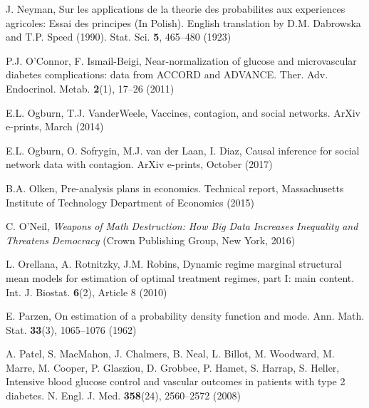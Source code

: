 \begin{list}{}{\setlength{\leftmargin}{2.1em}\setlength{\labelwidth}{0pt}
  \setlength{\labelsep}{0pt}\setlength{\itemindent}{-2.1em}
  \setlength{\parsep}{0pt}\setlength{\itemsep}{2pt}\setlength{\topsep}{0pt}}
\item\label{refentry:REF252}J. Neyman, Sur les applications de la theorie des probabilites aux experiences agricoles: Essai des principes (In Polish). English translation by D.M. Dabrowska and T.P. Speed (1990). Stat. Sci. \textbf{5}, 465--480 (1923)\label{refend:REF252}
\item\label{refentry:REF253}P.J. O'Connor, F. Ismail-Beigi, Near-normalization of glucose and microvascular diabetes complications: data from ACCORD and ADVANCE. Ther. Adv. Endocrinol. Metab. \textbf{2}(1), 17--26 (2011)\label{refend:REF253}
\item\label{refentry:REF254}E.L. Ogburn, T.J. VanderWeele, Vaccines, contagion, and social networks. ArXiv e-prints, March (2014)\label{refend:REF254}
\item\label{refentry:REF255}E.L. Ogburn, O. Sofrygin, M.J. van der Laan, I. Diaz, Causal inference for social network data with contagion. ArXiv e-prints, October (2017)\label{refend:REF255}
\item\label{refentry:REF256}B.A. Olken, Pre-analysis plans in economics. Technical report, Massachusetts Institute of Technology Department of Economics (2015)\label{refend:REF256}
\item\label{refentry:REF257}C. O'Neil, \textit{Weapons} \textit{of} \textit{Math} \textit{Destruction:} \textit{How} \textit{Big} \textit{Data} \textit{Increases} \textit{Inequality} \textit{and} \textit{Threatens} \textit{Democracy} (Crown Publishing Group, New York, 2016)\label{refend:REF257}
\item\label{refentry:REF258}L. Orellana, A. Rotnitzky, J.M. Robins, Dynamic regime marginal structural mean models for estimation of optimal treatment regimes, part I: main content. Int. J. Biostat. \textbf{6}(2), Article 8 (2010)\label{refend:REF258}
\item\label{refentry:REF259}E. Parzen, On estimation of a probability density function and mode. Ann. Math. Stat. \textbf{33}(3), 1065--1076 (1962)\label{refend:REF259}
\item\label{refentry:REF260}A. Patel, S. MacMahon, J. Chalmers, B. Neal, L. Billot, M. Woodward, M. Marre, M. Cooper, P. Glasziou, D. Grobbee, P. Hamet, S. Harrap, S. Heller, Intensive blood glucose control and vascular outcomes in patients with type 2 diabetes. N. Engl. J. Med. \textbf{358}(24), 2560--2572 (2008)\label{refend:REF260}

\end{list}
